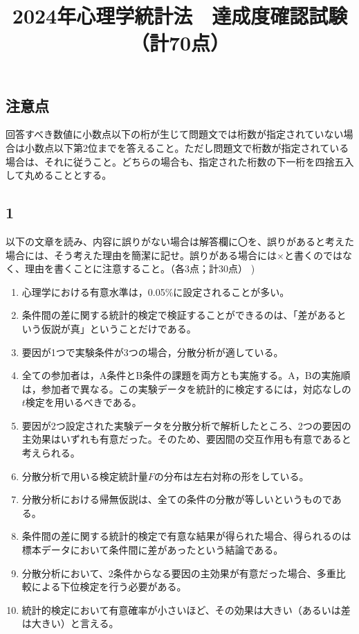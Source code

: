 \documentclass[
]{article}
\title{2024年心理学統計法　達成度確認試験（計70点）}
\author{}
\date{\vspace{-2.5em}}
\providecommand{\tightlist}{%
  \setlength{\itemsep}{0pt}\setlength{\parskip}{0pt}}
\begin{document}
\maketitle

\subsection{注意点}\label{ux6ce8ux610fux70b9}

回答すべき数値に小数点以下の桁が生じて問題文では桁数が指定されていない場合は小数点以下第2位までを答えること。ただし問題文で桁数が指定されている場合は、それに従うこと。どちらの場合も、指定された桁数の下一桁を四捨五入して丸めることとする。

\subsection{1}\label{section}

以下の文章を読み、内容に誤りがない場合は解答欄に〇を、誤りがあると考えた場合には、そう考えた理由を簡潔に記せ。誤りがある場合には×と書くのではなく、理由を書くことに注意すること。（各3点；計30点）
)

\begin{enumerate}
\def\labelenumi{\arabic{enumi}.}
\tightlist
\item
  心理学における有意水準は，0.05\%に設定されることが多い。
\item
  条件間の差に関する統計的検定で検証することができるのは、「差があるという仮説が真」ということだけである。
\item
  要因が1つで実験条件が3つの場合，分散分析が適している。
\item
  全ての参加者は，A条件とB条件の課題を両方とも実施する。A，Bの実施順は，参加者で異なる。この実験データを統計的に検定するには，対応なしの\(t\)検定を用いるべきである。
\item
  要因が2つ設定された実験データを分散分析で解析したところ、2つの要因の主効果はいずれも有意だった。そのため、要因間の交互作用も有意であると考えられる。
\item
  分散分析で用いる検定統計量\(F\)の分布は左右対称の形をしている。
\item
  分散分析における帰無仮説は、全ての条件の分散が等しいというものである。
\item
  条件間の差に関する統計的検定で有意な結果が得られた場合、得られるのは標本データにおいて条件間に差があったという結論である。
\item
  分散分析において、2条件からなる要因の主効果が有意だった場合、多重比較による下位検定を行う必要がある。
\item
  統計的検定において有意確率が小さいほど、その効果は大きい（あるいは差は大きい）と言える。
\end{enumerate}
\end{document}
